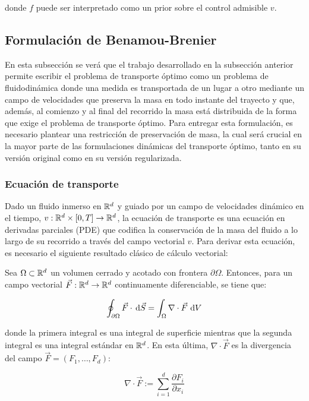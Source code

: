 donde $f$ puede ser interpretado como un prior sobre el control admisible $v$.

\subsection{Formulación de Benamou-Brenier}
\label{ot/dynamic/benamou_brenier}

En esta subsección se verá que el trabajo desarrollado en la subsección anterior permite escribir el problema de transporte óptimo como un problema de fluidodinámica donde una medida es transportada de un lugar a otro mediante un campo de velocidades que preserva la masa en todo instante del trayecto y que, además, al comienzo y al final del recorrido la masa está distribuida de la forma que exige el problema de transporte óptimo. Para entregar esta formulación, es necesario plantear una restricción de preservación de masa, la cual será crucial en la mayor parte de las formulaciones dinámicas del transporte óptimo, tanto en su versión original como en su versión regularizada.

\subsubsection{Ecuación de transporte}

Dado un fluido inmerso en $\mathbb{R}^d$ y guiado por un campo de velocidades dinámico en el tiempo, $v:\mathbb{R}^d\times[0,T]\to\mathbb{R}^d$, la ecuación de transporte es una ecuación en derivadas parciales (PDE) que codifica la conservación de la masa del fluido a lo largo de su recorrido a través del campo vectorial $v$. Para derivar esta ecuación, es necesario el siguiente resultado clásico de cálculo vectorial:

\begin{teo}
	\label{teo:gauss}
	Sea $\Omega\subset\mathbb{R}^d$ un volumen cerrado y acotado con frontera $\partial\Omega$. Entonces, para un campo vectorial $\vec{F}:\mathbb{R}^d\to\mathbb{R}^d$ continuamente diferenciable, se tiene que:

	\begin{equation*}
		\oint_{\partial\Omega} \vec{F} \cdot \,\operatorname{d}\! \vec{S}
		= \int_\Omega \nabla\cdot \vec{F} \,\operatorname{d}\! V
	\end{equation*}
	
	donde la primera integral es una integral de superficie mientras que la segunda integral es una integral estándar en $\mathbb{R}^d$. En esta última, $\nabla\cdot \vec{F}$ es la divergencia del campo $\vec{F} = (F_1,\ldots,F_d)$:

	\begin{equation*}
		\nabla\cdot \vec{F} := \sum_{i=1}^d \frac{\partial F_i}{\partial x_i}
	\end{equation*}

\end{teo}

